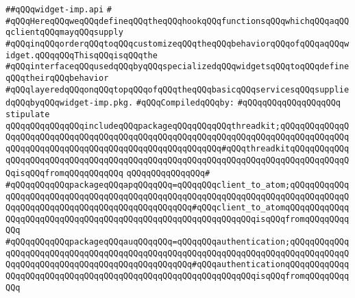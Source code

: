\label{src/lib/x-kit/widget/xkit/theme/widget/default/look/widget-imp.api}
\verb|##qQQqwidget-imp.api|\newline
\verb|#|\newline
\verb|#qQQqHereqQQqweqQQqdefineqQQqtheqQQqhookqQQqfunctionsqQQqwhichqQQqaqQQqclientqQQqmayqQQqsupply|\newline
\verb|#qQQqinqQQqorderqQQqtoqQQqcustomizeqQQqtheqQQqbehaviorqQQqofqQQqaqQQqwidget.qQQqqQQqThisqQQqisqQQqthe|\newline
\verb|#qQQqinterfaceqQQqusedqQQqbyqQQqspecializedqQQqwidgetsqQQqtoqQQqdefineqQQqtheirqQQqbehavior|\newline
\verb|#qQQqlayeredqQQqonqQQqtopqQQqofqQQqtheqQQqbasicqQQqservicesqQQqsuppliedqQQqbyqQQqwidget-imp.pkg.|\newline
\newline
\verb|#qQQqCompiledqQQqby:|\newline
\verb|#qQQqqQQqqQQqqQQqqQQq|\newline
\newline
\newline
\verb|stipulate|\newline
\verb|qQQqqQQqqQQqqQQqincludeqQQqpackageqQQqqQQqqQQqthreadkit;qQQqqQQqqQQqqQQqqQQqqQQqqQQqqQQqqQQqqQQqqQQqqQQqqQQqqQQqqQQqqQQqqQQqqQQqqQQqqQQqqQQqqQQqqQQqqQQqqQQqqQQqqQQqqQQqqQQqqQQqqQQqqQQq#qQQqthreadkitqQQqqQQqqQQqqQQqqQQqqQQqqQQqqQQqqQQqqQQqqQQqqQQqqQQqqQQqqQQqqQQqqQQqqQQqqQQqqQQqqQQqisqQQqfromqQQqqQQqqQQq|\newline
\verb|qQQqqQQqqQQqqQQq#|\newline
\verb|#qQQqqQQqqQQqpackageqQQqapqQQqqQQq=qQQqqQQqclient_to_atom;qQQqqQQqqQQqqQQqqQQqqQQqqQQqqQQqqQQqqQQqqQQqqQQqqQQqqQQqqQQqqQQqqQQqqQQqqQQqqQQqqQQqqQQqqQQqqQQqqQQqqQQqqQQqqQQqqQQqqQQq#qQQqclient_to_atomqQQqqQQqqQQqqQQqqQQqqQQqqQQqqQQqqQQqqQQqqQQqqQQqqQQqqQQqqQQqqQQqisqQQqfromqQQqqQQqqQQq|\newline
\verb|#qQQqqQQqqQQqpackageqQQqauqQQqqQQq=qQQqqQQqauthentication;qQQqqQQqqQQqqQQqqQQqqQQqqQQqqQQqqQQqqQQqqQQqqQQqqQQqqQQqqQQqqQQqqQQqqQQqqQQqqQQqqQQqqQQqqQQqqQQqqQQqqQQqqQQqqQQqqQQqqQQq#qQQqauthenticationqQQqqQQqqQQqqQQqqQQqqQQqqQQqqQQqqQQqqQQqqQQqqQQqqQQqqQQqqQQqqQQqisqQQqfromqQQqqQQqqQQq|\newline
